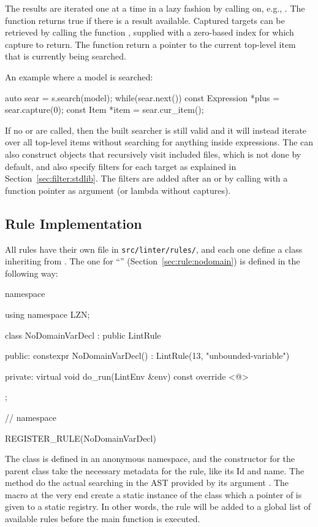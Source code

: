 \documentclass[a4paper,12pt]{article}
\newcommand{\ruleref}[1]{``\nameref{sec:rule:#1}'' (Section~\ref{sec:rule:#1})}
\begin{document}
The results are iterated one at a time in a lazy fashion by calling  on, e.g.,
. The function returns true if there is a result available. Captured
targets can be retrieved by calling the function , supplied with a zero-based
index for which capture to return. The function  return a pointer to the
current top-level item that is currently being searched.

An example where a model is searched:
\begin{cppp}[style=nonumbers]
auto sear = s.search(model);
while(sear.next()) {
  const Expression *plus = sear.capture(0);
  const Item *item = sear.cur_item();
}
\end{cppp}

If no  or  are called, then the built searcher is still valid and it will instead
iterate over all top-level items without searching for anything inside expressions.
The  can also construct  objects that recursively visit
included files, which is not done by default, and also specify filters for each target as
explained in Section~\ref{sec:filter:stdlib}. The filters are added after an 
or  by calling  with a function pointer as argument (or lambda
without captures).

\fussy %
\subsection{Rule Implementation}\label{sec:impl:rules}
All rules have their own file in \texttt{src/linter/rules/}, and each one define a class
inheriting from . The one for \ruleref{nodomain} is defined in the following way:
\begin{cppp}[label=lst:impl:rule,caption={\null}]
namespace {
using namespace LZN;

class NoDomainVarDecl : public LintRule {
public:
  constexpr NoDomainVarDecl()
     : LintRule(13, "unbounded-variable") {}

private:
  virtual void do_run(LintEnv &env) const override {<@\dots@>}
};

} // namespace

REGISTER_RULE(NoDomainVarDecl)
\end{cppp}
The class is defined in an anonymous namespace, and the constructor for the parent class take
the necessary metadata for the rule, like its Id and name. The method  do the
actual searching in the AST provided by its argument . The macro at the very end
create a static instance of the class which a pointer of is given to a static registry.
In other words, the rule will be added to a global list of available rules before the main
function is executed.
\end{document}
